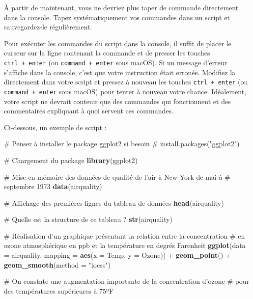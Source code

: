 \documentclass[
  a4paper,
]{article}
\newenvironment{Shaded}{\begin{snugshade}}{\end{snugshade}}
\newcommand{\CommentTok}[1]{\textcolor[rgb]{0.54,0.53,0.53}{#1}}
\newcommand{\DataTypeTok}[1]{\textcolor[rgb]{0.00,0.34,0.68}{#1}}
\newcommand{\KeywordTok}[1]{\textcolor[rgb]{0.12,0.11,0.11}{\textbf{#1}}}
\newcommand{\NormalTok}[1]{\textcolor[rgb]{0.12,0.11,0.11}{#1}}
\newcommand{\OperatorTok}[1]{\textcolor[rgb]{0.12,0.11,0.11}{#1}}
\newcommand{\StringTok}[1]{\textcolor[rgb]{0.75,0.01,0.01}{#1}}
\begin{document}
À partir de maintenant, vous ne devriez plus taper de commande directement dans la console. Tapez systématiquement vos commandes dans un script et sauvegardez-le régulièrement.

Pour exécuter les commandes du script dans la console, il suffit de placer le curseur sur la ligne contenant la commande et de presser les touches \texttt{ctrl\ +\ enter} (ou \texttt{command\ +\ enter} sous macOS). Si un message d'erreur s'affiche dans la console, c'est que votre instruction était erronée. Modifiez la directement dans votre script et pressez à nouveau les touches \texttt{ctrl\ +\ enter} (ou \texttt{command\ +\ enter} sous macOS) pour tenter à nouveau votre chance. Idéalement, votre script ne devrait contenir que des commandes qui fonctionnent et des commentaires expliquant à quoi servent ces commandes.

Ci-dessous, un exemple de script :

\begin{Shaded}
\begin{Highlighting}[]
\CommentTok{# Penser à installer le package ggplot2 si besoin}
\CommentTok{# install.packages("ggplot2")}

\CommentTok{# Chargement du package}
\KeywordTok{library}\NormalTok{(ggplot2)}

\CommentTok{# Mise en mémoire des données de qualité de l'air à New-York de mai à}
\CommentTok{# septembre 1973}
\KeywordTok{data}\NormalTok{(airquality)}

\CommentTok{# Affichage des premières lignes du tableau de données}
\KeywordTok{head}\NormalTok{(airquality)}

\CommentTok{# Quelle est la structure de ce tableau ?}
\KeywordTok{str}\NormalTok{(airquality)}

\CommentTok{# Réalisation d'un graphique présentant la relation entre la concentration}
\CommentTok{# en ozone atmosphérique en ppb et la température en degrés Farenheit}
\KeywordTok{ggplot}\NormalTok{(}\DataTypeTok{data =}\NormalTok{ airquality, }\DataTypeTok{mapping =} \KeywordTok{aes}\NormalTok{(}\DataTypeTok{x =}\NormalTok{ Temp, }\DataTypeTok{y =}\NormalTok{ Ozone)) }\OperatorTok{+}
\StringTok{  }\KeywordTok{geom_point}\NormalTok{() }\OperatorTok{+}
\StringTok{  }\KeywordTok{geom_smooth}\NormalTok{(}\DataTypeTok{method =} \StringTok{"loess"}\NormalTok{)}

\CommentTok{# On constate une augmentation importante de la concentration d'ozone }
\CommentTok{# pour des températures supérieures à 75ºF}
\end{Highlighting}
\end{Shaded}
\end{document}
